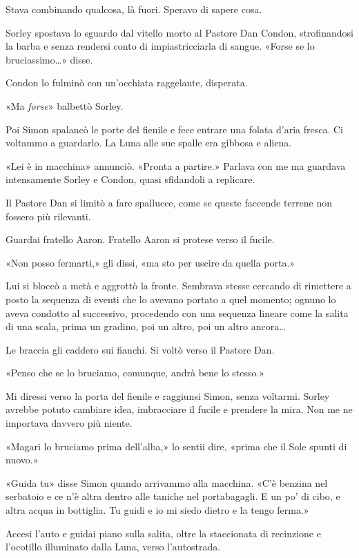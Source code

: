 Stava combinando qualcosa, là fuori. Speravo di sapere cosa.

Sorley spostava lo sguardo dal vitello morto al Pastore Dan Condon,
strofinandosi la barba e senza rendersi conto di impiastricciarla di
sangue. «Forse se lo bruciassimo\ldots» disse.

Condon lo fulminò con un'occhiata raggelante, disperata.

«Ma \emph{forse}» balbettò Sorley.

Poi Simon spalancò le porte del fienile e fece entrare una folata d'aria
fresca. Ci voltammo a guardarlo. La Luna alle sue spalle era gibbosa e
aliena.

«Lei è in macchina» annunciò. «Pronta a partire.» Parlava con me ma
guardava intensamente Sorley e Condon, quasi sfidandoli a replicare.

Il Pastore Dan si limitò a fare spallucce, come se queste faccende
terrene non fossero più rilevanti.

Guardai fratello Aaron. Fratello Aaron si protese verso il fucile.

«Non posso fermarti,» gli dissi, «ma sto per uscire da quella porta.»

Lui si bloccò a metà e aggrottò la fronte. Sembrava stesse cercando di
rimettere a posto la sequenza di eventi che lo avevano portato a quel
momento; ognuno lo aveva condotto al successivo, procedendo con una
sequenza lineare come la salita di una scala, prima un gradino, poi un
altro, poi un altro ancora\ldots{}

Le braccia gli caddero sui fianchi. Si voltò verso il Pastore Dan.

«Penso che se lo bruciamo, comunque, andrà bene lo stesso.»

Mi diressi verso la porta del fienile e raggiunsi Simon, senza voltarmi.
Sorley avrebbe potuto cambiare idea, imbracciare il fucile e prendere la
mira. Non me ne importava davvero più niente.

«Magari lo bruciamo prima dell'alba,» lo sentii dire, «prima che il Sole
spunti di nuovo.»

\separatorefiori

«Guida tu» disse Simon quando arrivammo alla macchina. «C'è benzina nel
serbatoio e ce n'è altra dentro alle taniche nel portabagagli. E un po'
di cibo, e altra acqua in bottiglia. Tu guidi e io mi siedo dietro e la
tengo ferma.»

Accesi l'auto e guidai piano sulla salita, oltre la staccionata di
recinzione e l'ocotillo illuminato dalla Luna, verso l'autostrada.
